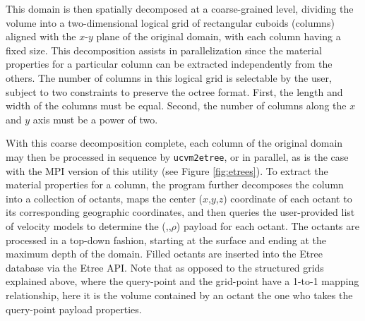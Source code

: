 

This domain is then spatially decomposed at a coarse-grained level, dividing the volume into a two-dimensional logical grid of rectangular cuboids (columns) aligned with the $x$-$y$ plane of the original domain, with each column having a fixed size. This decomposition assists in parallelization since the material properties for a particular column can be extracted independently from the others. The number of columns in this logical grid is selectable by the user, subject to two constraints to preserve the octree format. First, the length and width of the columns must be equal. Second, the number of columns along the $x$ and $y$ axis must be a power of two.

With this coarse decomposition complete, each column of the original domain may then be processed in sequence by \texttt{ucvm2etree}, or in parallel, as is the case with the MPI version of this utility (see Figure \ref{fig:etrees}). To extract the material properties for a column, the program further decomposes the column into a collection of octants, maps the center ($x$,$y$,$z$) coordinate of each octant to its corresponding geographic coordinates, and then queries the user-provided list of velocity models to determine the (\vp{},\vs{},$\rho$) payload for each octant. The octants are processed in a top-down fashion, starting at the surface and ending at the maximum depth of the domain. Filled octants are inserted into the Etree database via the Etree API. Note that as opposed to the structured grids explained above, where the query-point and the grid-point have a 1-to-1 mapping relationship, here it is the volume contained by an octant the one who takes the query-point payload properties.


